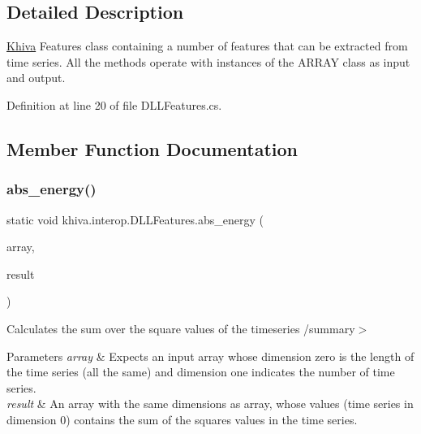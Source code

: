 \subsection{Detailed Description}
\mbox{\hyperlink{classkhiva_1_1_khiva}{Khiva}} Features class containing a number of features that can be extracted from time series. All the methods operate with instances of the A\+R\+R\+AY class as input and output. 



Definition at line 20 of file D\+L\+L\+Features.\+cs.



\subsection{Member Function Documentation}
\mbox{\label{classkhiva_1_1interop_1_1_d_l_l_features_add3f5d3cd2b14953f9472087ae07ba2f}} 
\subsubsection{\texorpdfstring{abs\+\_\+energy()}{abs\_energy()}}
{\footnotesize\ttfamily static void khiva.\+interop.\+D\+L\+L\+Features.\+abs\+\_\+energy (\begin{DoxyParamCaption}\item[{\mbox{[}\+In\mbox{]} ref Int\+Ptr}]{array,  }\item[{\mbox{[}\+Out\mbox{]} out Int\+Ptr}]{result }\end{DoxyParamCaption})\hspace{0.3cm}{\ttfamily [static]}}



Calculates the sum over the square values of the timeseries /summary$>$ 
\begin{DoxyParams}{Parameters}
{\em array} & Expects an input array whose dimension zero is the length of the time series (all the same) and dimension one indicates the number of time series.\\
\hline
{\em result} & An array with the same dimensions as array, whose values (time series in dimension 0) contains the sum of the squares values in the time series.\\
\hline
\end{DoxyParams}


